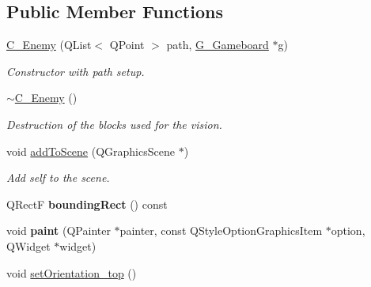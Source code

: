 \subsection*{Public Member Functions}
\begin{DoxyCompactItemize}
\item 
\hyperlink{class_c___enemy_aa558b403335f761a07e5c998bfdbfcf7}{C\+\_\+\+Enemy} (Q\+List$<$ Q\+Point $>$ path, \hyperlink{class_g___gameboard}{G\+\_\+\+Gameboard} $\ast$g)
\begin{DoxyCompactList}\small\item\em Constructor with path setup. \end{DoxyCompactList}\item 
\hypertarget{class_c___enemy_a12004d3ed4e2f8232b13fc9f85f4a87e}{}\hyperlink{class_c___enemy_a12004d3ed4e2f8232b13fc9f85f4a87e}{$\sim$\+C\+\_\+\+Enemy} ()\label{class_c___enemy_a12004d3ed4e2f8232b13fc9f85f4a87e}

\begin{DoxyCompactList}\small\item\em Destruction of the blocks used for the vision. \end{DoxyCompactList}\item 
\hypertarget{class_c___enemy_a4296ca16b6d9a1f49178a07b5b7b087e}{}void \hyperlink{class_c___enemy_a4296ca16b6d9a1f49178a07b5b7b087e}{add\+To\+Scene} (Q\+Graphics\+Scene $\ast$)\label{class_c___enemy_a4296ca16b6d9a1f49178a07b5b7b087e}

\begin{DoxyCompactList}\small\item\em Add self to the scene. \end{DoxyCompactList}\item 
\hypertarget{class_c___enemy_a242979f0349cdc20ccee7653f0cf6577}{}Q\+Rect\+F {\bfseries bounding\+Rect} () const \label{class_c___enemy_a242979f0349cdc20ccee7653f0cf6577}

\item 
\hypertarget{class_c___enemy_a396dd980565a61a72f824efdc0f5fe1b}{}void {\bfseries paint} (Q\+Painter $\ast$painter, const Q\+Style\+Option\+Graphics\+Item $\ast$option, Q\+Widget $\ast$widget)\label{class_c___enemy_a396dd980565a61a72f824efdc0f5fe1b}

\item 
\hypertarget{class_c___enemy_a6770756bf739e86895c66c32ee60d312}{}void \hyperlink{class_c___enemy_a6770756bf739e86895c66c32ee60d312}{set\+Orientation\+\_\+top} ()\label{class_c___enemy_a6770756bf739e86895c66c32ee60d312}


\end{DoxyCompactItemize}
